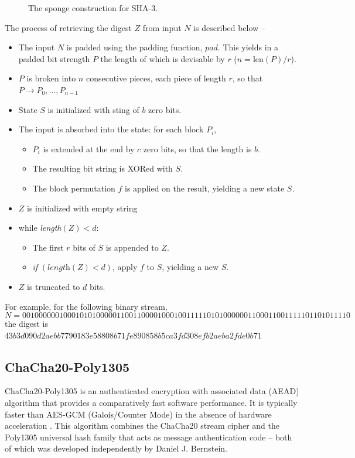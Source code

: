 \documentclass[a4paper]{cas-sc}
\begin{document}
\begin{figure}[pos=h]
    \centering
    
    \caption{The sponge construction for SHA-3.}
    \label{fig:sponge}
\end{figure}

The process of retrieving the digest $Z$ from input $N$ is described below --
\begin{itemize}
    \item The input $N$ is padded using the padding function, $pad$. This yields in a padded bit strength $P$ the length of which is devisable by $r$ ($n=\text{len}(P)/r$).
    \item $P$ is broken into $n$ consecutive pieces, each piece of length $r$, so that $P \to P_{0},\ldots,P_{n-1}$
    \item State $S$ is initialized with sting of $b$ zero bits.
    \item The input is absorbed into the state: for each block $P_{i}$, \begin{itemize}
              \item $P_{i}$ is extended at the end by $c$ zero bits, so that the length is $b$.
              \item The resulting bit string is XORed with $S$.
              \item The block permutation $f$ is applied on the result, yielding a new state $S$.
          \end{itemize}
    \item $Z$ is initialized with empty string
    \item while \textit{length}$(Z)<d$:\begin{itemize}
              \item The first $r$ bits of $S$ is appended to $Z$.
              \item \textit{if} $(\textit{length}(Z)<d)$, apply $f$ to $S$, yielding a new $S$.
          \end{itemize}
    \item $Z$ is truncated to $d$ bits.
\end{itemize}

For example, for the following binary stream, \[N=00100000010001010100000110011000010001001111101010000001100011001111101101011110\]
the digest is $43b3d090d2aebb7790183e58808b71fe890858b5ca3fd308efb2aeba2fde0b71$
\subsection{ChaCha20-Poly1305}
\label{sec:chacha20}
ChaCha20-Poly1305 is an authenticated encryption with associated data (AEAD) algorithm that provides a comparatively fast software performance. It is typically faster than AES-GCM (Galois/Counter Mode) in the absence of hardware acceleration \cite{rfc7539}. This algorithm combines the ChaCha20 stream cipher \cite{bernstein2008chacha} and the Poly1305 \cite{bernstein2005poly1305} universal hash family that acts as message authentication code -- both of which was developed independently by Daniel J. Bernstein.
\end{document}

